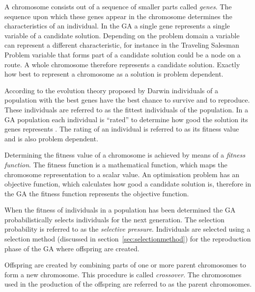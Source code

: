 A chromosome consists out of a sequence of smaller parts called \emph{genes}\cite{CompuIntelligenceIntro}. The sequence upon which these genes appear in the chromosome determines the characteristics of an individual\cite{CompuIntelligenceIntro}. In the \gls{GA} a single gene represents a single variable of a candidate solution. Depending on the problem domain a variable can represent a different characteristic, for instance in the Traveling Salesman Problem  variable that forms part of a candidate solution could be a node on a route\cite{FamilyGA,AcceleratingGA}. A whole chromosome therefore represents a candidate solution\cite{FamilyGA,AcceleratingGA}. Exactly how best to represent a chromosome as a solution is problem dependent\cite{CompuIntelligenceIntro}.

According to the evolution theory proposed by Darwin individuals of a population with the best genes have the best chance to survive and to reproduce\cite{CompuIntelligenceIntro}. These individuals are referred to as the fittest individuals of the population. In a \gls{GA} population each individual is ``rated'' to determine how good the solution its genes represents \cite{CompuIntelligenceIntro}. The rating of an individual is referred to as its fitness value and is also problem dependent\cite{CompuIntelligenceIntro}.

Determining the fitness value of a chromosome is achieved by means of a \emph{fitness function}. The fitness function is a mathematical function, which maps the chromosome representation to a scalar value\cite{CompuIntelligenceIntro}. An optimisation problem has an objective function, which calculates how good a candidate solution is, therefore in the \gls{GA} the fitness function represents the objective function\cite{CompuIntelligenceIntro}.

When the fitness of individuals in a population has been determined the \gls{GA} probabilistically selects individuals for the next generation\cite{CompuIntelligenceIntro}. The selection probability is referred to as the \emph{selective pressure}\cite{CompuIntelligenceIntro}. Individuals are selected using a selection method (discussed in section~\ref{sec:selectionmethod}) for the reproduction phase of the \gls{GA} where offspring are created\cite{CompuIntelligenceIntro}.

Offspring are created by combining parts of one or more parent chromosomes to form a new chromosome. This procedure is called \emph{crossover}\cite{CompuIntelligenceIntro}. The chromosomes used in the production of the offspring are referred to as the parent chromosomes\cite{CompuIntelligenceIntro}.

